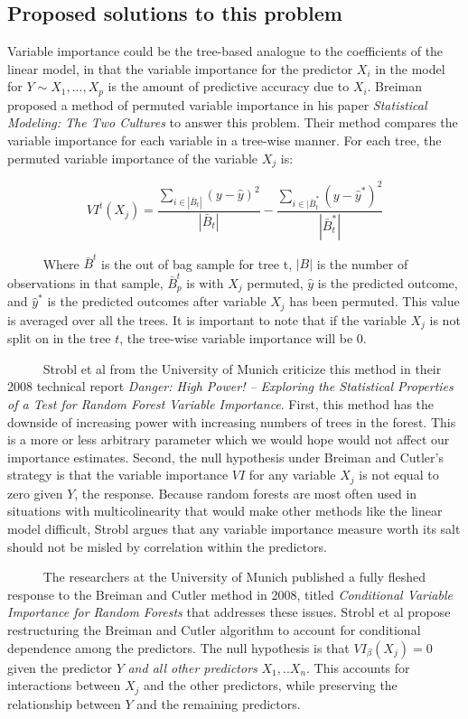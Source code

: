 \documentclass[12pt,twoside]{reedthesis}
\begin{document}
  \subsection{Proposed solutions to this
  problem}\label{proposed-solutions-to-this-problem}
  
  Variable importance could be the tree-based analogue to the coefficients
  of the linear model, in that the variable importance for the predictor
  \(X_i\) in the model for \(Y \sim X_1,...,X_p\) is the amount of
  predictive accuracy due to \(X_i\). Breiman proposed a method of
  permuted variable importance in his paper \emph{Statistical Modeling:
  The Two Cultures} to answer this problem. Their method compares the
  variable importance for each variable in a tree-wise manner. For each
  tree, the permuted variable importance of the variable \(X_j\) is:
  
  \[VI^t(X_j) = \frac{\sum_{i \in |\bar{B}_t|} ({y} - \hat{y})^2}{|\bar{B}_t|} - \frac{\sum_{i \in |\bar{B}_t^*} ({y} - \hat{y}^*)^2}{|\bar{B}_t^*|} \]
  
  ~~~~~ Where \(\bar{B}^t\) is the out of bag sample for tree t, \(|B|\)
  is the number of observations in that sample, \(\bar{B}_p^t\) is with
  \(X_j\) permuted, \(\hat{y}\) is the predicted outcome, and
  \(\hat{y}^*\) is the predicted outcomes after variable \(X_j\) has been
  permuted. This value is averaged over all the trees. It is important to
  note that if the variable \(X_j\) is not split on in the tree \(t\), the
  tree-wise variable importance will be 0.
  
  ~~~~~ Strobl et al from the University of Munich criticize this method
  in their 2008 technical report \emph{Danger: High Power! -- Exploring
  the Statistical Properties of a Test for Random Forest Variable
  Importance}. First, this method has the downside of increasing power
  with increasing numbers of trees in the forest. This is a more or less
  arbitrary parameter which we would hope would not affect our importance
  estimates. Second, the null hypothesis under Breiman and Cutler's
  strategy is that the variable importance \(VI\) for any variable \(X_j\)
  is not equal to zero given \(Y\), the response. Because random forests
  are most often used in situations with multicolinearity that would make
  other methods like the linear model difficult, Strobl argues that any
  variable importance measure worth its salt should not be misled by
  correlation within the predictors.
  
  ~~~~~ The researchers at the University of Munich published a fully
  fleshed response to the Breiman and Cutler method in 2008, titled
  \emph{Conditional Variable Importance for Random Forests} that addresses
  these issues. Strobl et al propose restructuring the Breiman and Cutler
  algorithm to account for conditional dependence among the predictors.
  The null hypothesis is that \(VI_{\beta}(X_j) = 0\) given the predictor
  \(Y\) \emph{and all other predictors} \(X_1,..X_n\). This accounts for
  interactions between \(X_j\) and the other predictors, while preserving
  the relationship between \(Y\) and the remaining predictors.
  
\end{document}
